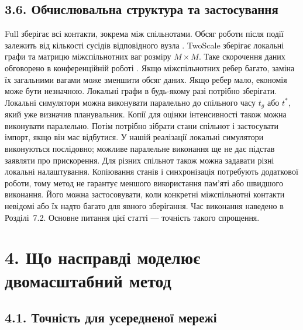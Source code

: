 \documentclass[11pt,a4paper]{article}
\newcommand{\Full}{\textnormal{Full}}
\newcommand{\TS}{\textnormal{TwoScale}}
\begin{document}
\subsection*{3.6. Обчислювальна структура та застосування}

\Full{} зберігає всі контакти, зокрема між спільнотами. Обсяг роботи після події залежить від кількості сусідів відповідного вузла \citep{kuryliak2025simulating}. \TS{} зберігає локальні графи та матрицю міжспільнотних ваг розміру $M\times M$. Таке скорочення даних обговорено в конференційній роботі \citep{kuryliak2025towards}. Якщо міжспільнотних ребер багато, заміна їх загальними вагами може зменшити обсяг даних. Якщо ребер мало, економія може бути незначною. Локальні графи в будь-якому разі потрібно зберігати.
Локальні симулятори можна виконувати паралельно до спільного часу $t_g$ або $t^\ast$, який уже визначив планувальник. Копії для оцінки інтенсивності також можна виконувати паралельно. Потім потрібно зібрати стани спільнот і застосувати імпорт, якщо він має відбутися. У нашій реалізації локальні симулятори виконуються послідовно; можливе паралельне виконання ще не дає підстав заявляти про прискорення. Для різних спільнот також можна задавати різні локальні налаштування.
Копіювання станів і синхронізація потребують додаткової роботи, тому метод не гарантує меншого використання пам'яті або швидшого виконання. Його можна застосовувати, коли конкретні міжспільнотні контакти невідомі або їх надто багато для явного зберігання. Час виконання наведено в Розділі~7.2. Основне питання цієї статті --- точність такого спрощення.
\clearpage
\section*{4. Що насправді моделює двомасштабний метод}

\subsection*{4.1. Точність для усередненої мережі}
\end{document}
